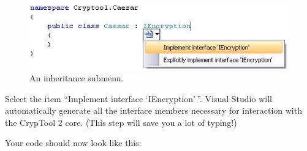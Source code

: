 \begin{figure}[h!]
	\centering
		\includegraphics{figures/inherit_submenu.jpg}
	\caption{An inheritance submenu.}
	\label{fig:inherit_submenu}
\end{figure}

Select the item ``Implement interface `IEncryption'\,''. Visual Studio will automatically generate all the interface members necessary for interaction with the CrypTool 2 core. (This step will save you a lot of typing!)
\clearpage

\noindent Your code should now look like this:

